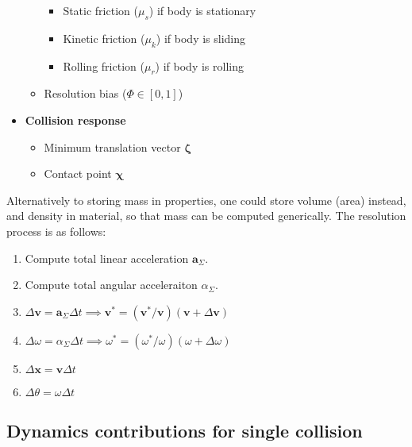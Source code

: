 \documentclass[10pt]{report}
\begin{document}
\begin{itemize}
\begin{itemize}
\begin{itemize}
\item Static friction ($\mu_s$) if body is stationary
\item Kinetic friction ($\mu_k$) if body is sliding
\item Rolling friction ($\mu_r$) if body is rolling
\end{itemize}
\item Resolution bias ($\Phi\in[0,1]$)
\end{itemize}
\item \textbf{Collision response}
\begin{itemize}
\item Minimum translation vector $\boldsymbol{\zeta}$
\item Contact point $\boldsymbol{\chi}$
\end{itemize}
\end{itemize}
Alternatively to storing mass in properties, one could store volume (area) instead, and density in material, so that mass can be computed generically. The resolution process is as follows:
\begin{enumerate}
\item Compute total linear acceleration $\boldsymbol{a}_\Sigma$.
\item Compute total angular acceleraiton $\alpha_\Sigma$.
\item $\Delta\boldsymbol{v}=\boldsymbol{a}_\Sigma\Delta t\implies\boldsymbol{v}^*=(\boldsymbol{v}^*/\boldsymbol{v})(\boldsymbol{v}+\Delta\boldsymbol{v})$
\item $\Delta\omega=\alpha_\Sigma\Delta t\implies\omega^*=(\omega^*/\omega)(\omega+\Delta\omega)$
\item $\Delta\boldsymbol{x}=\boldsymbol{v}\Delta t$
\item $\Delta\theta=\omega\Delta t$
\end{enumerate}

\subsection{Dynamics contributions for single collision}
\end{document}
